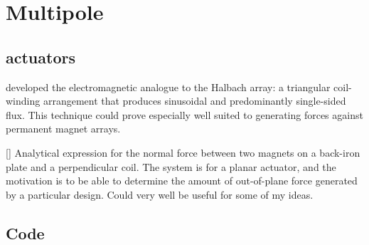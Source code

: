 
\chapter{Multipole}


\section{actuators}

\textcite{trumper1996} developed the electromagnetic analogue to the
Halbach array: a triangular coil-winding arrangement that produces
sinusoidal and predominantly single-sided flux. This technique could
prove especially well suited to generating forces against permanent
magnet arrays.


[\textcite{dasilveira2005}] Analytical expression for the normal force between two magnets on a back-iron plate and a perpendicular coil.
The system is for a planar actuator, and the motivation is to be able to determine the amount of out-of-plane force generated by a particular design.
Could very well be useful for some of my ideas.

\section{Code}

